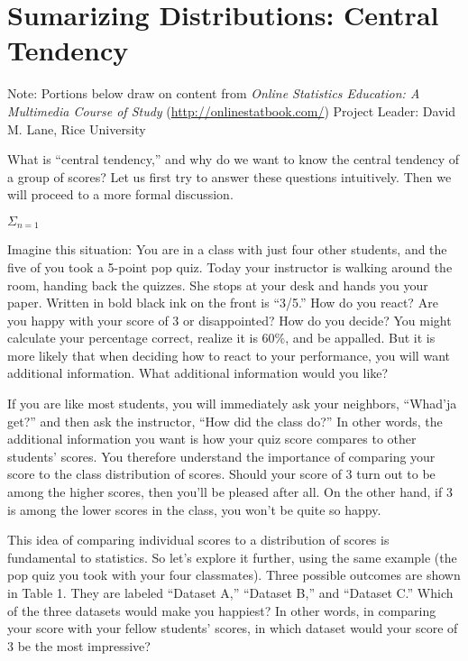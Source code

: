 \documentclass[
]{book}
\begin{document}
\hypertarget{sumarizing-distributions-central-tendency}{%
\chapter{Sumarizing Distributions: Central Tendency}\label{sumarizing-distributions-central-tendency}}

Note: Portions below draw on content from
\emph{Online Statistics Education: A Multimedia Course of Study}
(\url{http://onlinestatbook.com/}) Project Leader: David M. Lane, Rice University

What is ``central tendency,'' and why do we want to know the central tendency of a group of scores? Let us first try to answer these questions intuitively. Then we will proceed to a more formal discussion.

\(\Sigma_{n=1}\)

Imagine this situation: You are in a class with just four other students, and the five of you took a 5-point pop quiz. Today your instructor is walking around the room, handing back the quizzes. She stops at your desk and hands you your paper. Written in bold black ink on the front is ``3/5.'' How do you react? Are you happy with your score of 3 or disappointed? How do you decide? You might calculate your percentage correct, realize it is 60\%, and be appalled. But it is more likely that when deciding how to react to your performance, you will want additional information. What additional information would you like?

If you are like most students, you will immediately ask your neighbors, ``Whad'ja get?'' and then ask the instructor, ``How did the class do?'' In other words, the additional information you want is how your quiz score compares to other students' scores. You therefore understand the importance of comparing your score to the class distribution of scores. Should your score of 3 turn out to be among the higher scores, then you'll be pleased after all. On the other hand, if 3 is among the lower scores in the class, you won't be quite so happy.

This idea of comparing individual scores to a distribution of scores is fundamental to statistics. So let's explore it further, using the same example (the pop quiz you took with your four classmates). Three possible outcomes are shown in Table 1. They are labeled ``Dataset A,'' ``Dataset B,'' and ``Dataset C.'' Which of the three datasets would make you happiest? In other words, in comparing your score with your fellow students' scores, in which dataset would your score of 3 be the most impressive?
\end{document}
